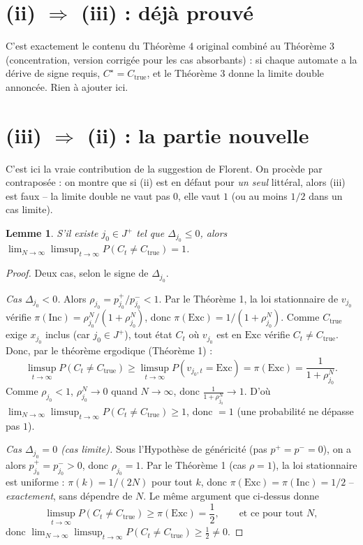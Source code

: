 \documentclass[11pt]{article}
\newtheorem{lemma}{Lemme}
\theoremstyle{remark}
\newcommand{\Inc}{\ensuremath{\mathrm{Inc}}}
\newcommand{\Exc}{\ensuremath{\mathrm{Exc}}}
\begin{document}
\section{(ii) $\Rightarrow$ (iii) : déjà prouvé}

C'est exactement le contenu du Théorème 4 original combiné au Théorème 3
(concentration, version corrigée pour les cas absorbants) : si chaque
automate a la dérive de signe requis, $C^\star=C_{\mathrm{true}}$, et le
Théorème 3 donne la limite double annoncée. Rien à ajouter ici.

\section{(iii) $\Rightarrow$ (ii) : la partie nouvelle}

C'est ici la vraie contribution de la suggestion de Florent. On procède par
contraposée : on montre que si (ii) est en défaut pour \emph{un seul}
littéral, alors (iii) est faux -- la limite double ne vaut pas $0$, elle
vaut $1$ (ou au moins $1/2$ dans un cas limite).

\begin{lemma}\label{lem:witness}
S'il existe $j_0\in J^+$ tel que $\Delta_{j_0}\le0$, alors
$\lim_{N\to\infty}\limsup_{t\to\infty}P(C_t\ne C_{\mathrm{true}})=1$.
\end{lemma}

\begin{proof}
Deux cas, selon le signe de $\Delta_{j_0}$.

\emph{Cas $\Delta_{j_0}<0$.} Alors $\rho_{j_0}=p_{j_0}^+/p_{j_0}^-<1$. Par le
Théorème 1, la loi stationnaire de $v_{j_0}$ vérifie
$\pi(\Inc)=\rho_{j_0}^N/(1+\rho_{j_0}^N)$, donc
$\pi(\Exc)=1/(1+\rho_{j_0}^N)$. Comme $C_{\mathrm{true}}$ exige $x_{j_0}$
inclus (car $j_0\in J^+$), tout état $C_t$ où $v_{j_0}$ est en $\Exc$ vérifie
$C_t\ne C_{\mathrm{true}}$. Donc, par le théorème ergodique (Théorème 1) :
\[
  \limsup_{t\to\infty}P(C_t\ne C_{\mathrm{true}})
  \ge \limsup_{t\to\infty}P(v_{j_0,t}=\Exc) = \pi(\Exc) = \frac1{1+\rho_{j_0}^N}.
\]
Comme $\rho_{j_0}<1$, $\rho_{j_0}^N\to0$ quand $N\to\infty$, donc
$\frac1{1+\rho_{j_0}^N}\to1$. D'où
$\lim_{N\to\infty}\limsup_{t\to\infty}P(C_t\ne C_{\mathrm{true}})\ge1$, donc
$=1$ (une probabilité ne dépasse pas $1$).

\emph{Cas $\Delta_{j_0}=0$ (cas limite).} Sous l'Hypothèse de généricité
(pas $p^+=p^-=0$), on a alors $p_{j_0}^+=p_{j_0}^->0$, donc $\rho_{j_0}=1$.
Par le Théorème 1 (cas $\rho=1$), la loi stationnaire est uniforme :
$\pi(k)=1/(2N)$ pour tout $k$, donc $\pi(\Exc)=\pi(\Inc)=1/2$ --
\emph{exactement}, sans dépendre de $N$. Le même argument que ci-dessus donne
\[
  \limsup_{t\to\infty}P(C_t\ne C_{\mathrm{true}}) \ge \pi(\Exc) = \frac12,
  \qquad\text{et ce pour tout } N,
\]
donc $\lim_{N\to\infty}\limsup_{t\to\infty}P(C_t\ne C_{\mathrm{true}})\ge\frac12\ne0$.
\end{proof}
\end{document}
